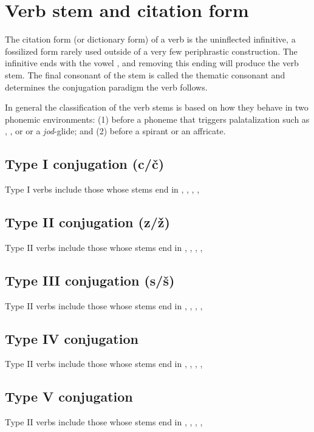 \section{Verb stem and citation form}

\par The citation form (or dictionary form) of a verb is the uninflected infinitive, a fossilized form rarely used outside of a very few periphrastic construction. The infinitive ends with the vowel , and removing this ending will produce the verb stem. The final consonant  of the stem is called the thematic consonant and determines the conjugation paradigm the verb follows.

In general the classification of the verb stems is based on how they behave in two phonemic environments: (1) before a phoneme that triggers palatalization such as , ,  or  or a \emph{jod}-glide; and (2) before a spirant or an affricate.

\subsection{Type I conjugation (c/č)}
Type I verbs include those whose stems end in , , , ,

\subsection{Type II conjugation (z/ž)}
Type II verbs include those whose stems end in , , , ,

\subsection{Type III conjugation (s/š)}
Type II verbs include those whose stems end in , , , ,

\subsection{Type IV conjugation}
Type II verbs include those whose stems end in , , , ,

\subsection{Type V conjugation}
Type II verbs include those whose stems end in , , , ,


